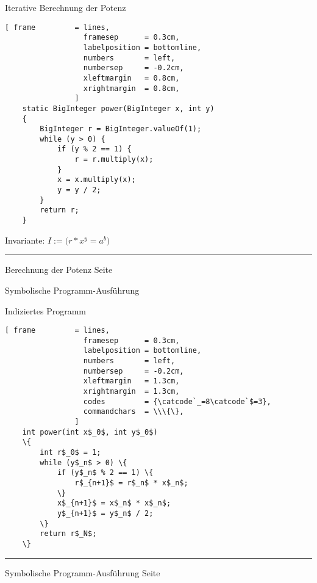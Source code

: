 \documentclass{slides}
\newcounter{mypage}
\begin{document}
\begin{slide}{}
\normalsize

\begin{center}
Iterative Berechnung der Potenz
\end{center}
\vspace*{0.5cm}

\footnotesize
\begin{Verbatim}[ frame         = lines, 
                  framesep      = 0.3cm, 
                  labelposition = bottomline,
                  numbers       = left,
                  numbersep     = -0.2cm,
                  xleftmargin   = 0.8cm,
                  xrightmargin  = 0.8cm,
                ]
    static BigInteger power(BigInteger x, int y)
    {
        BigInteger r = BigInteger.valueOf(1);
        while (y > 0) {
            if (y % 2 == 1) {
                r = r.multiply(x);
            } 
            x = x.multiply(x);
            y = y / 2;            
        } 
        return r;
    }
\end{Verbatim}

Invariante: \qquad $I := \bigl(r * x^y = a^b\bigr)$


\vspace*{\fill}
\tiny \addtocounter{mypage}{1}
\rule{17cm}{1mm}
Berechnung der Potenz \hspace*{\fill} Seite 
\end{slide}

\begin{slide}{}
\normalsize

\begin{center}
Symbolische Programm-Ausf\"uhrung
\end{center}
\vspace*{0.5cm}

\footnotesize
Indiziertes Programm
\begin{Verbatim}[ frame         = lines, 
                  framesep      = 0.3cm, 
                  labelposition = bottomline,
                  numbers       = left,
                  numbersep     = -0.2cm,
                  xleftmargin   = 1.3cm,
                  xrightmargin  = 1.3cm,
                  codes         = {\catcode`_=8\catcode`$=3},
                  commandchars  = \\\{\},
                ]
    int power(int x$_0$, int y$_0$)
    \{
        int r$_0$ = 1;
        while (y$_n$ > 0) \{
            if (y$_n$ % 2 == 1) \{
                r$_{n+1}$ = r$_n$ * x$_n$;
            \} 
            x$_{n+1}$ = x$_n$ * x$_n$;
            y$_{n+1}$ = y$_n$ / 2;            
        \} 
        return r$_N$;
    \}
\end{Verbatim}

\vspace*{\fill}
\tiny \addtocounter{mypage}{1}
\rule{17cm}{1mm}
Symbolische Programm-Ausf\"uhrung \hspace*{\fill} Seite 
\end{slide}
\end{document}
